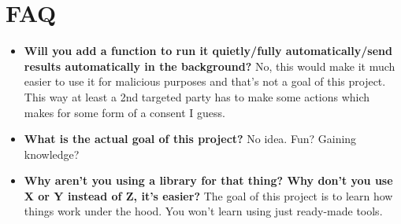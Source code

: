 \chapter{FAQ}
\begin{itemize}
  \item \textbf{Will you add a function to run it quietly/fully automatically/send results automatically in the background?} No, this would make it much easier to use it for malicious purposes and that's not a goal of this project. This way at least a 2nd targeted party has to make some actions which makes for some form of a consent I guess.
  \item \textbf{What is the actual goal of this project?} No idea. Fun? Gaining knowledge?
  \item \textbf{Why aren't you using a library for that thing? Why don't you use X or Y instead of Z, it's easier?} The goal of this project is to learn how things work under the hood. You won't learn using just ready-made tools.
\end{itemize}